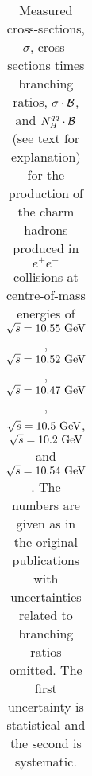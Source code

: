 {\begin{table}[hbpt]
\begin{tabular}{|c|c|c|c|c|}
\end{tabular}
\caption{
{Measured  cross-sections, $\sigma$, cross-sections times branching ratios, 
$\sigma \cdot {\cal B}$, and $N^{q\bar{q}}_{H} \cdot {\cal B}$(see text for explanation) 
for the production of the charm hadrons produced in $e^+e^-$ collisions
at centre-of-mass energies of   
$\sqrt{s}=10.55~{\text{Ge}\kern-0.06667em\text{V\/}}$\!\protect\cite{Bortoletto:1988kw},
$\sqrt{s}=10.52~{\text{Ge}\kern-0.06667em\text{V\/}}$\!\protect\cite{Avery:1990bc,Seuster:2005tr},
$\sqrt{s}=10.47~{\text{Ge}\kern-0.06667em\text{V\/}}$\!\protect\cite{Albrecht:1991ss},
$\sqrt{s}=10.5~{\text{Ge}\kern-0.06667em\text{V\/}}$\!\protect\cite{Albrecht:1991pa},
$\sqrt{s}=10.2~{\text{Ge}\kern-0.06667em\text{V\/}}$\!\protect\cite{Albrecht:1988an} and
$\sqrt{s}=10.54~{\text{Ge}\kern-0.06667em\text{V\/}}$\!\protect\cite{Aubert:2006cp,Aubert:2002ue}.
The numbers are given as in the original publications with
uncertainties related to branching ratios omitted.
 The first uncertainty is statistical and the second is systematic. 
}}
\label{tab:EEUmeas}
\end{table}
}

\newcommand{\tabEEUaverage}{
\begin{table}[htbp]\small\centering
\begin{tabular}{|c|c|c|}\hline
&Fixed $\sigma(e^+e^- \rightarrow c\bar{c})$& Constrained $S$\\\hline\hline

\end{tabular}
\caption{Average of charm-quark fragmentation fractions in hadrons in 
$e^+e^-$ collisions around $\sqrt{s}=\sqrtS~\GeV$. The quantities $S$, $R_{u/d}$, $P^{d}_{V}$ and $\gamma_{s}$ were 
recalculated from the fit results taking into account correlation of fit parameters.
The value of minimized $\chi^2$  and the number degrees of freedom of the fit $n_{\text{dof}}$ are given as well.
}
\label{tab:EEUaverage}
\end{table}
}










